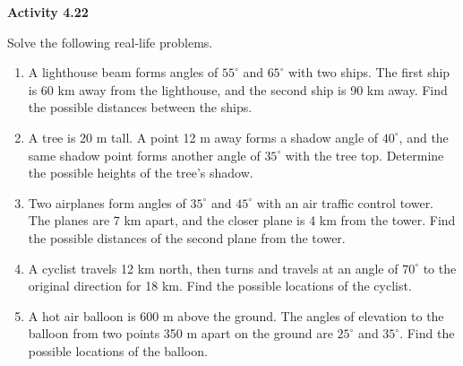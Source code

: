 \vspace{0.3ex}
\noindent\textbf{Activity 4.22}

\vspace{0.2ex}

Solve the following real-life problems. 

\begin{enumerate}
    \item A lighthouse beam forms angles of \(55^\circ\) and \(65^\circ\) with two ships. The first ship is 60 km away from the lighthouse, and the second ship is 90 km away. Find the possible distances between the ships.
    \item A tree is 20 m tall. A point 12 m away forms a shadow angle of \(40^\circ\), and the same shadow point forms another angle of \(35^\circ\) with the tree top. Determine the possible heights of the tree's shadow.
    \item Two airplanes form angles of \(35^\circ\) and \(45^\circ\) with an air traffic control tower. The planes are 7 km apart, and the closer plane is 4 km from the tower. Find the possible distances of the second plane from the tower.
    \item A cyclist travels 12 km north, then turns and travels at an angle of \(70^\circ\) to the original direction for 18 km. Find the possible locations of the cyclist.
    \item A hot air balloon is 600 m above the ground. The angles of elevation to the balloon from two points 350 m apart on the ground are \(25^\circ\) and \(35^\circ\). Find the possible locations of the balloon.
\end{enumerate}

